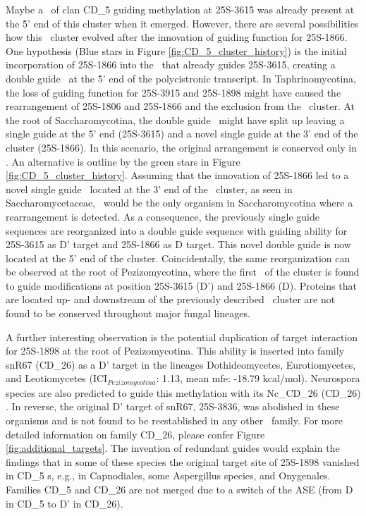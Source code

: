 Maybe a \sno\ of clan CD\_5 guiding methylation at 25S-3615 was already
present at the 5' end of this cluster when it emerged. However, there are
several possibilities how this \sno\ cluster evolved after the
innovation of guiding function for 25S-1866.  One hypothesis (Blue stars in
Figure \ref{fig:CD_5_cluster_history}) is the initial incorporation of
25S-1866 into the \sno\ that already guides 25S-3615, creating a double
guide \sno\ at the 5' end of the polycistronic transcript. In
Taphrinomycotina, the loss of guiding function for 25S-3915 and 25S-1898
might have caused the rearrangement of 25S-1806 and 25S-1866 and the
exclusion from the \sno\ cluster. At the root of Saccharomycotina, the
double guide \sno\ might have split up leaving a single guide at the 5' end
(25S-3615) and a novel single guide at the 3' end of the cluster
(25S-1866). In this scenario, the original arrangement is conserved
only in \Yli. An alternative is outline by the green stars in
Figure \ref{fig:CD_5_cluster_history}. Assuming that the innovation of
25S-1866 led to a novel single guide \sno\ located at the 3' end of the
\sno\ cluster, as seen in Saccharomycetaceae, \yli\ would be the only
organism in Saccharomycotina where a rearrangement is detected. As a
consequence, the previously single guide sequences are reorganized into a
double guide sequence with guiding ability for 25S-3615 as D' target and
25S-1866 as D target. This novel double guide is now located at the 5' end
of the cluster.  Coincidentally, the same reorganization can be observed at the
root of Pezizomycotina, where the first \sno\ of the cluster is found to
guide modifications at position 25S-3615 (D') and 25S-1866 (D). Proteins
that are located up- and downstream of the previously described \sno\
cluster are not found to be conserved throughout major fungal lineages.

A further interesting observation is the potential duplication of target
interaction for 25S-1898 at the root of Pezizomycotina. This ability is
inserted into family snR67 (CD\_26) as a D' target in the lineages
Dothideomycetes, Eurotiomycetes, and Leotiomycetes (ICI$_{Pezizomycotina}$:
1.13, mean mfe: -18.79 kcal/mol). Neurospora species are also predicted to
guide this methylation with its Nc\_CD\_26 (CD\_26) \sno
\cite{Liu:2009}. In reverse, the original D' target of snR67, 25S-3836, was
abolished in these organisms and is not found to be reestablished in any
other \sno\ family. For more detailed information on family CD\_26, please
confer Figure \ref{fig:additional_targets}. The invention of redundant
guides would explain the findings that in some of these species the
original target site of 25S-1898 vanished in CD\_5 \sno s, e.g., in
Capnodiales, some Aspergillus species, and Onygenales. Families
CD\_5 and CD\_26 are not merged due to a switch of the ASE (from D in CD\_5
to D' in CD\_26).

